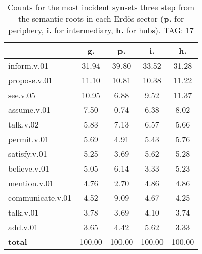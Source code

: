 \begin{table}[h!]
\begin{center}
\begin{tabular}{| l | c | c | c | c |}\hline
 & g. & p. & i. & h. \\\hline
inform.v.01 & 31.94  & 39.80  & 33.52  & 31.28 \\\hline
propose.v.01 & 11.10  & 10.81  & 10.38  & 11.22 \\\hline
see.v.05 & 10.95  & 6.88  & 9.52  & 11.37 \\\hline
assume.v.01 & 7.50  & 0.74  & 6.38  & 8.02 \\\hline
talk.v.02 & 5.83  & 7.13  & 6.57  & 5.66 \\\hline
permit.v.01 & 5.69  & 4.91  & 5.43  & 5.76 \\\hline
satisfy.v.01 & 5.25  & 3.69  & 5.62  & 5.28 \\\hline
believe.v.01 & 5.05  & 6.14  & 3.33  & 5.23 \\\hline
mention.v.01 & 4.76  & 2.70  & 4.86  & 4.86 \\\hline
communicate.v.01 & 4.52  & 9.09  & 4.67  & 4.25 \\\hline
talk.v.01 & 3.78  & 3.69  & 4.10  & 3.74 \\\hline
add.v.01 & 3.65  & 4.42  & 5.62  & 3.33 \\\hline
{{\bf total}} & 100.00  & 100.00  & 100.00  & 100.00 \\\hline
\end{tabular}
\caption{Counts for the most incident synsets three step from the semantic roots in each Erd\"os sector ({\bf p.} for periphery, {\bf i.} for intermediary, {\bf h.} for hubs). TAG: 17}
\end{center}
\end{table}